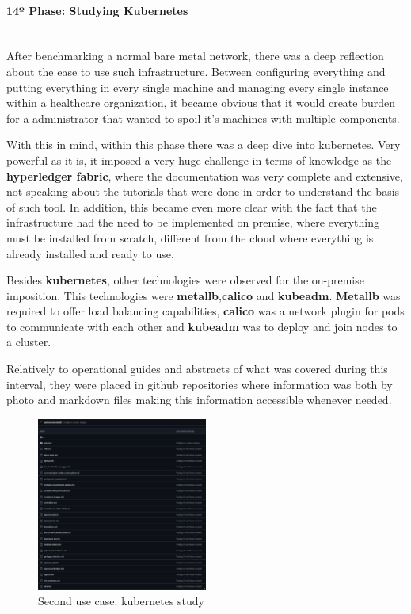 \paragraph{14º Phase: Studying Kubernetes}\mbox{}\\
After benchmarking a normal bare metal network, there was a deep reflection about the ease to use such infrastructure. Between configuring everything and putting everything in every single machine and managing every single instance within a healthcare organization, it became obvious that it would create burden for a administrator that wanted to spoil it's machines with multiple components. 

With this in mind, within this phase there was a deep dive into kubernetes. Very powerful as it is, it imposed a very huge challenge in terms of knowledge as the \textbf{hyperledger fabric}, where the documentation was very complete and extensive, not speaking about the tutorials that were done in order to understand the basis of such tool. In addition, this became even more clear with the fact that the infrastructure had the need to be implemented on premise, where everything must be installed from scratch, different from the cloud where everything is already installed and ready to use.

Besides \textbf{kubernetes}, other technologies were observed for the on-premise imposition. This technologies were \textbf{metallb},\textbf{calico} and \textbf{kubeadm}. \textbf{Metallb} was required to offer load balancing capabilities, \textbf{calico} was a network plugin for pods to communicate with each other and \textbf{kubeadm} was to deploy and join nodes to a cluster.

Relatively to operational guides and abstracts of what was covered during this interval, they were placed in github repositories where information was both by photo and markdown files making this information accessible whenever needed.

\begin{figure}[H]
    \centering
    \includegraphics[width=0.5\textwidth]{assets/use-case-2/kubernetes-study.png} %
    \caption{Second use case: kubernetes study}
    \label{fig:sample-image} 
\end{figure}

